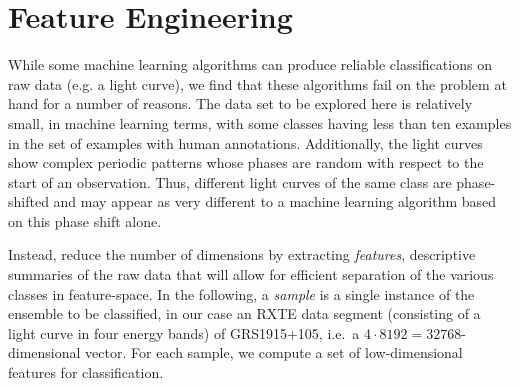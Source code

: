 \documentclass[12pt]{emulateapj}
\begin{document}
\section{Feature Engineering}
\label{sec:featureengineering}

While some machine learning algorithms can produce reliable classifications on raw data (e.g. a light curve), we find that these algorithms fail on the problem at hand for a number of reasons. The data set to be explored here is relatively small, in machine learning terms, with some classes having less than ten examples in the set of examples with human annotations. Additionally, the light curves show complex periodic patterns whose phases are random with respect to the start of an observation. Thus, different light curves of the same class are phase-shifted and may appear as very different to a machine learning algorithm based on this phase shift alone.

Instead, reduce the number of dimensions by extracting \textit{features}, descriptive summaries of the raw data that will allow for efficient separation of the various classes in feature-space.
In the following, a \textit{sample} is a single instance of the ensemble to be classified, in our case an RXTE data segment (consisting of a light curve in four energy bands) of GRS1915+105, i.e.\ a $4 \cdot 8192 = 32768$-dimensional vector. For each sample, we compute a set of low-dimensional features for classification. %
\end{document}
